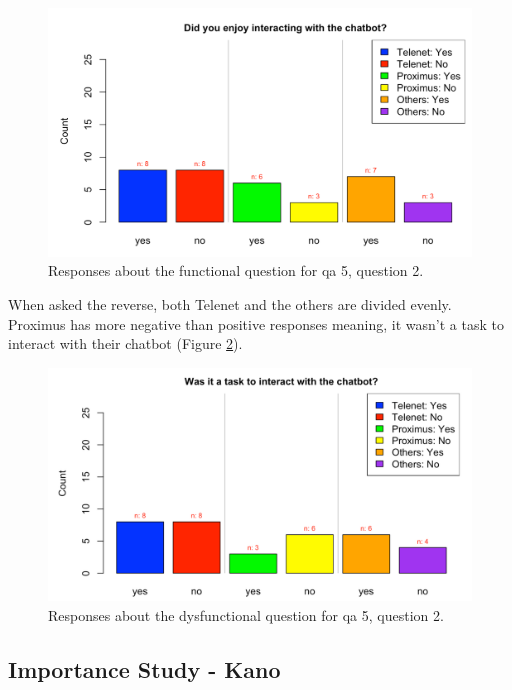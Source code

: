 \begin{figure}[!htb]
	\centering
	\includegraphics[width=375pt]{../LaTeX/Figures/Comparative/Q5b.png}
	\caption{Responses about the functional question for \acrshort{qa} 5, question 2.}\label{fig:Q5b}
\end{figure}
When asked the reverse, both Telenet and the others are divided evenly. Proximus has more negative than positive responses meaning, it wasn't a task to interact with their chatbot (Figure \ref{fig:DQ5b}).\\
\begin{figure}[!htb]
	\centering
	\includegraphics[width=375pt]{../LaTeX/Figures/Comparative/DQ5b.png}
	\caption{Responses about the dysfunctional question for \acrshort{qa} 5, question 2.}\label{fig:DQ5b}
\end{figure}
\FloatBarrier
\FloatBarrier
\subsection{Importance Study - Kano}
